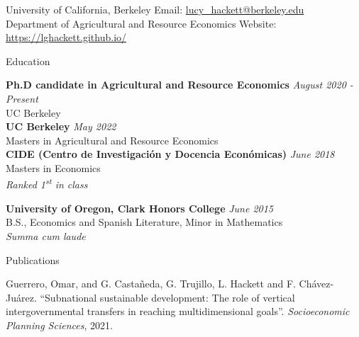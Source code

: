 \documentclass{resume} %
\begin{document}
\begin{rSection}{}
University of California, Berkeley \hfill Email:  \href{mailto:lucy\_hackett@berkeley.edu}{lucy\_hackett@berkeley.edu}\\
Department of Agricultural and Resource Economics \hfill Website:  \href{https://lghackett.github.io/}{https://lghackett.github.io/}\\
\end{rSection}


\begin{rSection}{Education}

{\bf Ph.D candidate in Agricultural and Resource Economics} \hfill {\em August 2020 - Present} 
\\ UC Berkeley\hfill \\

{\bf UC Berkeley} \hfill {\em May 2022} 
\\ Masters in Agricultural and Resource Economics\hfill\\

{\bf CIDE (Centro de Investigación y Docencia Económicas)} \hfill {\em June 2018} 
\\ Masters in Economics\hfill\\
\textit{Ranked 1\textsuperscript{st} in class}
\vspace{0.1cm}

{\bf University of Oregon, Clark Honors College} \hfill {\em June 2015} 
\\ B.S., Economics and Spanish Literature, Minor in Mathematics  \hfill\\
\textit{Summa cum laude}
\end{rSection}

\begin{rSection}{Publications}
\item Guerrero, Omar, and G. Castañeda, G. Trujillo, L. Hackett and F. Chávez-Juárez. ``Subnational sustainable development: The role of vertical intergovernmental transfers in reaching multidimensional goals''. \textit{Socioeconomic Planning Sciences}, 2021.
\end{rSection}
\end{document}
